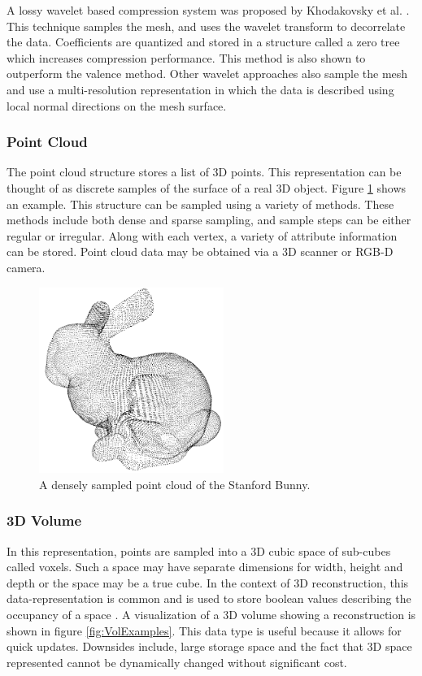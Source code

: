 A lossy wavelet based compression system was proposed by Khodakovsky et al. \cite{Khodakovsky00Progressive}. This technique samples the mesh, and uses the wavelet transform to decorrelate the data. Coefficients are quantized and stored in a structure called a zero tree which increases compression performance. This method is also shown to outperform the valence method. Other wavelet approaches \cite{Guskov00Normal,Khodakovsky04Normalmesh} also sample the mesh and use a multi-resolution representation in which the data is described using local normal directions on the mesh surface. \\


\subsubsection{Point Cloud}

The point cloud structure stores a list of 3D points. This representation can be thought of as discrete samples of the surface of a real 3D object. Figure \ref{PointCloudExample} shows an example. This structure can be sampled using a variety of methods. These methods include both dense and sparse sampling, and sample steps can be either regular or irregular. Along with each vertex, a variety of attribute information can be stored. Point cloud data may be obtained via a 3D scanner or RGB-D camera. 

\begin{figure}[!htb]
\centering
\includegraphics[width=6cm]{images/ch2/PointCloudExample}
\caption{A densely sampled point cloud of the Stanford Bunny.}
\label{PointCloudExample}
\end{figure}


\subsubsection{3D Volume}

In this representation, points are sampled into a 3D cubic space of sub-cubes called voxels. Such a space may have separate dimensions for width, height and depth or the space may be a true cube. In the context of 3D reconstruction, this data-representation is common and is used to store boolean values describing the occupancy of a space \cite{Rusinkiewicz02Real}. A visualization of a 3D volume showing a reconstruction is shown in figure \ref{fig:VolExamples}. This data type is useful because it allows for quick updates. Downsides include, large storage space and the fact that 3D space represented cannot be dynamically changed without significant cost. \\

